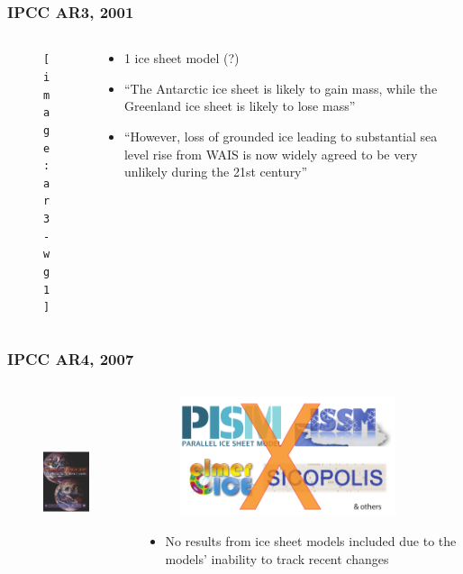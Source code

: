 \documentclass[hide notes,intlimits]{beamer}
\begin{document}
\begin{frame}
  \frametitle{IPCC AR3, 2001}
  \begin{columns}[c]
    \begin{column}{.4\linewidth}
      \begin{figure}
        \texttt{[image: ar3-wg1]}
      \end{figure}
    \end{column}
    \begin{column}{.5\linewidth}
      \begin{itemize}
        \item 1 ice sheet model (?)
        \item ``The Antarctic ice sheet is likely to gain mass, while the Greenland ice sheet is likely to lose mass''
        \item ``However, loss of grounded ice leading to substantial sea level rise from WAIS is now widely agreed to be very unlikely during the 21st century''
      \end{itemize}
    \end{column}
\end{columns}
\end{frame}


\begin{frame}
  \frametitle{IPCC AR4, 2007}
  \begin{columns}[c]
    \begin{column}{.4\linewidth}
      \begin{figure}
        \includegraphics[height=5cm]{ar4-wg1}
      \end{figure}
    \end{column}
    \begin{column}{.5\linewidth}
      \begin{figure}
        \includegraphics[height=3.5cm]{no-ice-sheet-models}
      \end{figure}
      \begin{itemize}
      \item No results from ice sheet models included due to the models' inability to track recent changes
      \end{itemize}
    \end{column}
\end{columns}
\end{frame}
\end{document}
